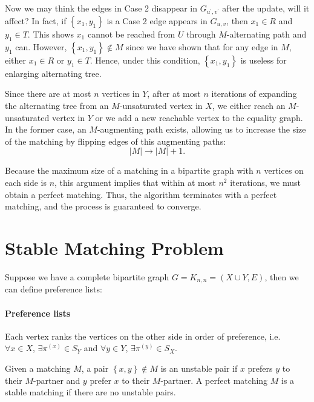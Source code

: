 \begin{remark}
Now we may think the edges in Case 2 disappear in \(G_{u^{\prime} , v^{\prime}}\) after the update, will it affect? In fact, if \(\left\{ x_1, y_1 \right\} \) is a Case 2 edge appears in \(G_{u, v}\), then \(x_1 \in R\) and \(y_1 \in T\). This shows \(x_1\) cannot be reached from \(U\) through \(M\)-alternating path and \(y_1\) can. However, \(\left\{ x_1, y_1 \right\} \notin M\) since we have shown that for any edge in \(M\), either \(x_1 \in R\) or \(y_1 \in T\). Hence, under this condition, \(\left\{ x_1, y_1 \right\} \) is useless for enlarging alternating tree.                

\medskip

Since there are at most $n$ vertices in $Y$, after at most $n$ iterations of expanding the alternating tree from an $M$-unsaturated vertex in $X$, 
we either reach an $M$-unsaturated vertex in $Y$ or we add a new reachable vertex to the equality graph. 
In the former case, an $M$-augmenting path exists, allowing us to increase the size of the matching by flipping edges of this augmenting paths:
\[
|M| \longrightarrow |M| + 1.
\]

\medskip

Because the maximum size of a matching in a bipartite graph with $n$ vertices on each side is $n$, 
this argument implies that within at most $n^2$ iterations, we must obtain a perfect matching. 
Thus, the algorithm terminates with a perfect matching, and the process is guaranteed to converge.
\end{remark}


\section{Stable Matching Problem}
Suppose we have a complete bipartite graph \(G = K_{n, n} = (X \cup Y, E)\), then we can define preference lists: 
\paragraph{Preference lists} Each vertex ranks the vertices on the other side in order of preference, i.e. \(\forall x \in X\), \(\exists \pi ^{(x)} \in S_Y\) and \(\forall y \in Y\), \(\exists \pi ^{(y)} \in S_X\).

\begin{definition}
    Given a matching \(M\), a pair \(\left\{ x, y \right\} \notin M \) is an unstable pair if \(x\) prefers \(y\) to their \(M\)-partner and \(y\) prefer \(x\) to their \(M\)-partner. A perfect matching \(M\) is a stable matching if there are no unstable pairs.         
\end{definition}

